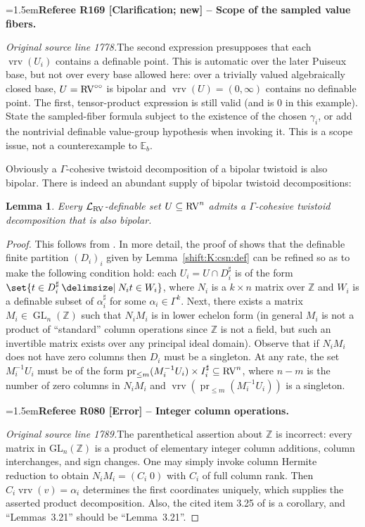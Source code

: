 \documentclass[12pt]{amsart}
\newcommand{\RefereeRemark}[4]{%
  \par\medskip\begingroup\normalfont\small\color{RefereePurple}%
  \emergencystretch=1.5em\noindent\textbf{Referee R#1 [#2] -- #3.}\par\nobreak\noindent #4\par
  \endgroup\medskip
}
\theoremstyle{plain}
\newtheorem{lem}[thm]{Lemma}
\theoremstyle{definition}
\theoremstyle{remark}
\numberwithin{equation}{section}
\theoremstyle{plain}
\newcommand{\RV}{\textup{RV}}
\DeclareMathOperator{\pr}{pr}
\DeclareMathOperator{\mgl}{GL}
\newcommand{\Z}{\mathds{Z}}
\newcommand{\0}{\emptyset}
\newcommand{\lan}[3]{\mathcal{L}_{#1 \textup{#2} #3}}
\newcommand{\sub}{\subseteq}
\providecommand\given{}
\newcommand\SetSymbol[1][]{%
\nonscript \: #1 \vert
\allowbreak
\nonscript\:
\mathopen{}}
\renewcommand\given{\SetSymbol[\delimsize]}
\DeclareMathOperator{\vrv}{vrv}
\newcommand{\ccirc}{\circ \circ}
\begin{document}
\RefereeRemark{169}{Clarification; new}{Scope of the sampled value fibers}{%
\textit{Original source line 1778.}\quad The second expression presupposes that each $\vrv(U_i)$ contains a definable point. This is automatic over the later Puiseux base, but not over every base allowed here: over a trivially valued algebraically closed base, $U=\RV^{\ccirc}$ is bipolar and $\vrv(U)=(0,\infty)$ contains no definable point. The first, tensor-product expression is still valid (and is $0$ in this example). State the sampled-fiber formula subject to the existence of the chosen $\gamma_i$, or add the nontrivial definable value-group hypothesis when invoking it. This is a scope issue, not a counterexample to $\mathbb E_b$.
}

Obviously a $\Gamma$-cohesive twistoid decomposition of a bipolar twistoid is also bipolar. There is indeed an abundant supply of bipolar twistoid decompositions:

\begin{lem}\label{coh:decom}
Every $\lan{}{RV}{}$-definable set $U \sub \RV^n$ admits a $\Gamma$-cohesive twistoid decomposition that is also bipolar.
\end{lem}
\begin{proof}
This follows from \cite[Lemmas~3.21, 3.25]{hrushovski:kazhdan:integration:vf}. In more detail, the proof of \cite[Lemmas~3.21]{hrushovski:kazhdan:integration:vf} shows that the definable finite partition $(D_i)_i$ given by Lemma~\ref{shift:K:csn:def} can be refined so as to make the following condition hold:  each $U_i = U \cap D_i^\sharp$ is of the form $\set{t \in D_i^\sharp \given N_it \in W_i}$, where $N_i$ is a $k \times n$ matrix over $\Z$ and $W_i$ is a definable subset of $\alpha_i^\sharp$ for some $\alpha_i \in \Gamma^k$. Next, there exists a matrix $M_i \in \mgl_n(\Z)$ such that $N_iM_i$ is in lower echelon form (in general $M_i$ is not a product of ``standard'' column operations since $\Z$ is not a field, but  such an invertible matrix exists over any  principal ideal domain). Observe that if $N_iM_i$ does not have zero columns then $D_i$ must be a singleton. At any rate, the set $M_i^{-1}U_i$ must be of the form $\pr_{\leq m}(M_i^{-1}U_i) \times I_i^\sharp \sub \RV^n$, where $n-m$ is the number of zero columns in $N_iM_i$ and $\vrv(\pr_{\leq m}(M_i^{-1}U_i))$ is a singleton.

\RefereeRemark{080}{Error}{Integer column operations}{%
\textit{Original source line 1789.}\quad The parenthetical assertion about $\mathbb Z$ is incorrect: every matrix in $\mathrm{GL}_n(\mathbb Z)$ is a product of elementary integer column additions, column interchanges, and sign changes. One may simply invoke column Hermite reduction to obtain $N_iM_i=(C_i\;0)$ with $C_i$ of full column rank. Then $C_i\vrv(v)=\alpha_i$ determines the first coordinates uniquely, which supplies the asserted product decomposition. Also, the cited item 3.25 of \cite{hrushovski:kazhdan:integration:vf} is a corollary, and ``Lemmas~3.21'' should be ``Lemma~3.21''.
}
\end{proof}
\end{document}
